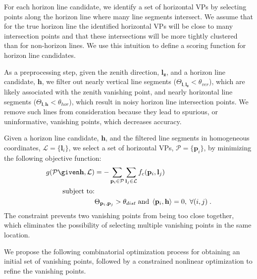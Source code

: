 For each horizon line candidate, we identify a set of horizontal VPs
by selecting points along the horizon line where many line segments
intersect. We assume that for the true horizon line the identified
horizontal VPs will be close to many intersection points and that
these intersections will be more tightly clustered than for
non-horizon lines. We use this intuition to define a scoring function
for horizon line candidates.

As a preprocessing step, given the zenith direction, $\mathbf{l}_{\mathbf{z}}$,
and a horizon line candidate, $\mathbf{h}$, we filter out nearly vertical
line segments ($\Theta_{\mathbf{l},\mathbf{l}_{\mathbf{z}}} < \theta_{ver}$), which are
likely associated with the zenith vanishing point, and nearly
horizontal line segments ($\Theta_{\mathbf{l},\mathbf{h}} < \theta_{hor}$), which
result in noisy horizon line intersection points.  We remove such
lines from consideration because they lead to spurious, or
uninformative, vanishing points, which decreases accuracy.

Given a horizon line candidate, $\mathbf{h}$, and the filtered line segments
in homogeneous coordinates, $\mathcal{L} = \{\mathbf{l}_i\}$, we select
a set of horizontal VPs, $\mathcal{P} = \{\mathbf{p}_i\}$, by minimizing
the following objective function:
%
\begin{align} 
  g(\mathcal{P} \given \mathbf{h}, \mathcal{L}) & = -\sum_{\mathbf{p}_i
    \in \mathcal{P}} {\sum_{\mathbf{l}_j \in
      \mathcal{L}}f_c(\mathbf{p}_i, \mathbf{l}_j)}
  \label{eq:obj} \\
  \text{subject to:} \nonumber \\
   & \Theta_{\mathbf{p}_i,\mathbf{p}_j} > \theta_{dist}
  \; \text{and} \; \left< \mathbf{p}_i,\mathbf{h} \right>=0, 
  \; \forall (i,j) \nonumber \; .
\end{align} 
%
The constraint prevents two vanishing points from being too close
together, which eliminates the possibility of selecting multiple
vanishing points in the same location.

We propose the following combinatorial optimization process for
obtaining an initial set of vanishing points, followed by a
constrained nonlinear optimization to refine the vanishing points.

